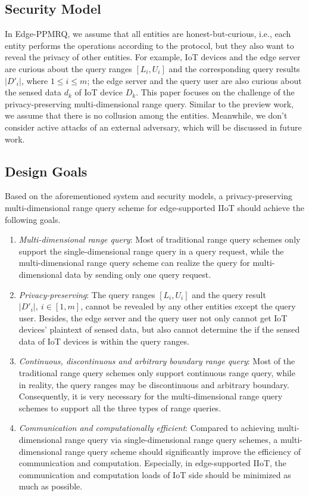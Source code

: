 \documentclass[IEEE JOURNAL OF BIOMEDICAL AND HEALTH INFORMATICS]{IEEEtran}
\begin{document}
\subsection{Security Model}
In Edge-PPMRQ, we assume that all entities are honest-but-curious, i.e., each entity performs the operations according to the protocol, but they also want to reveal the privacy of other entities. For example, IoT devices and the edge server are curious about the query ranges $[L_i, U_i]$ and the corresponding query results $|D'_i|$, where $1 \le i \le m$; the edge server and the query user are also curious about the sensed data $d_k$ of IoT device $D_k$. This paper focuses on  the challenge of the privacy-preserving multi-dimensional range query. Similar to the preview work, we assume that there is no collusion among the entities. Meanwhile, we don't consider active attacks of an external adversary, which will be discussed in future work.

\subsection{Design Goals}
Based on the aforementioned system and security models, a privacy-preserving multi-dimensional range query scheme for edge-supported IIoT should achieve the following goals.
\begin{enumerate}

	\item \emph{Multi-dimensional range query}: Most of traditional range query schemes only support the single-dimensional range query in a query request, while the multi-dimensional range query scheme can realize the query for multi-dimensional data by sending only one query request.

	\item\emph{Privacy-preserving}: The query ranges $[L_i, U_i]$ and the query result $|D'_i|,\ i \in [1, m]$,  cannot be revealed by any other entities except the query user. Besides, the edge server and the query user not only cannot get IoT devices' plaintext of sensed data, but also cannot determine the if the sensed data of IoT devices is within the query ranges.
	
	\item \emph{Continuous, discontinuous and arbitrary boundary range query}:
	Most of the traditional range query schemes only support continuous range query, while in reality, the query ranges may be discontinuous and arbitrary boundary. Consequently, it is very necessary for the multi-dimensional range query schemes to support all the three types of range queries.
	 
	\item \emph{Communication and computationally efficient}: Compared to achieving multi-dimensional range query via single-dimensional range query schemes, a multi-dimensional range query scheme should significantly improve the efficiency of communication and computation. Especially, in edge-supported IIoT, the communication and computation loads of IoT side should be minimized as much as possible.
\end{enumerate}
\end{document}
